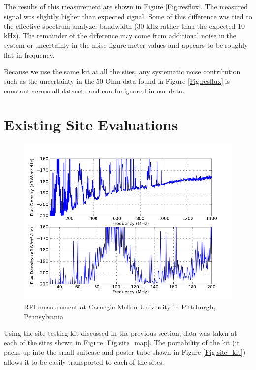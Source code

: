 The results of this measurement are shown in Figure \ref{Fig:resflux}. The measured signal was slightly higher than expected signal. Some of this difference was tied to the effective spectrum analyzer bandwidth (30 kHz rather than the expected 10 kHz). The remainder of the difference may come from additional noise in the system or uncertainty in the noise figure meter values and appears to be roughly flat in frequency. 


Because we use the same kit at all the sites, any systematic noise contribution such as the uncertainty in the 50 Ohm data found in Figure \ref{Fig:resflux} is constant across all datasets and can be ignored in our data. 

\section{Existing Site Evaluations}

\begin{figure}[tb]
\begin{center}
\includegraphics[width=0.9\linewidth]{RFI_testing/figures/Pittsburgh_cal.png}
\caption{RFI measurement at Carnegie Mellon University in Pittsburgh, Pennsylvania}
\label{Fig:pghcal}
\end{center}
\end{figure}


Using the site testing kit discussed in the previous section, data was taken at each of the sites shown in Figure \ref{Fig:site_map}. The portability of the kit (it packs up into the small suitcase and poster tube shown in Figure \ref{Fig:site_kit}) allows it to be easily transported to each of the sites. 

